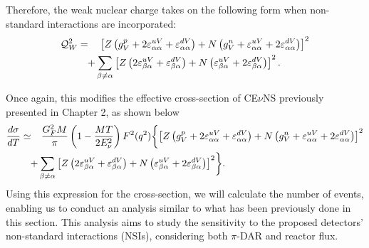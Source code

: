 Therefore, the weak nuclear charge takes on the following form when non-standard interactions are incorporated:
\begin{equation*}
\begin{split}
\mathcal{Q}_W^2
    &=\phantom{-}\left[Z\left(g_V^p +2\varepsilon_{\alpha \alpha}^{uV}+\varepsilon_{\alpha \alpha}^{dV}\right)+N \left(g_V^n + \varepsilon _{\alpha \alpha}^{uV}+2\varepsilon_{\alpha \alpha}^{dV}\right)\right]^2\\
    &\quad\smash[b]+ \sum_{\beta\neq\alpha} \left[Z\left(2\varepsilon_{\beta \alpha}^{uV}+\varepsilon_{\beta \alpha}^{dV}\right) + N \left(\varepsilon_{ \beta \alpha}^{uV}+2\varepsilon_{\beta \alpha}^{dV}\right)\right]^2.
\end{split}
\end{equation*}

Once again, this modifies the effective cross-section of CE$\nu$NS previously presented in Chapter 2, as shown below \cite{Barranco_2005}
\begin{equation}
\begin{split}
\frac{d \sigma}{dT} 
&\simeq \phantom{-}\frac{G^2_F M}{\pi} \left(1-\frac{MT}{2E^2_\nu}\right) F^2(q^2)\biggl\{ \left[Z \left(g^p_V +2 \varepsilon_{\alpha \alpha}^{uV} + \varepsilon_{\alpha \alpha}^{dV}\right) + N \left(g_V^{n} + \varepsilon_{\alpha \alpha}^{uV} + 2 \varepsilon_{\alpha \alpha}^{dV}\right) \right]^2\\ 
&\quad\smash[b]+ \sum_{\beta \neq \alpha} \left[Z \left(2 \varepsilon_{\beta \alpha}^{uV}+\varepsilon
_{\beta \alpha}^{dV}\right) + N\left(\varepsilon_{\beta \alpha}^{uV} + 2\varepsilon_{\beta \alpha}^{dV}\right)\right]^2 \biggr\}.
\end{split}
\end{equation}
Using this expression for the cross-section, we will calculate the number of events, enabling us to conduct an analysis similar to what has been previously done in this section. This analysis aims to study the sensitivity to the proposed detectors' non-standard interactions (NSIs), considering both  $\pi$-DAR and reactor flux.




